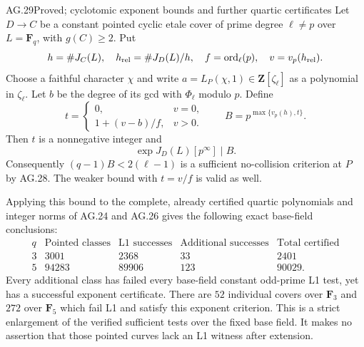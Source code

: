 \begin{claim}{AG.29}{Proved; cyclotomic exponent bounds and further quartic certificates}
Let $D\to C$ be a constant pointed cyclic etale cover
of prime degree $\ell\ne p$ over $L=\mathbf F_q$,
with $g(C)\ge2$. Put
\[
 h=\#J_C(L),\quad h_{\rm rel}=\#J_D(L)/h,
 \quad f=\operatorname{ord}_\ell(p),\quad v=v_p(h_{\rm rel}).
\]
Choose a faithful character $\chi$ and write
$a=L_P(\chi,1)\in\mathbf Z[\zeta_\ell]$ as a polynomial
in $\zeta_\ell$. Let $b$ be the degree of its gcd with
$\Phi_\ell$ modulo $p$. Define
\[
 t=\begin{cases}
 0,&v=0,\\
 1+(v-b)/f,&v>0.
 \end{cases}
 \qquad B=p^{\max\{v_p(h),t\}}.                       \tag{AG.29.1}
\]
Then $t$ is a nonnegative integer and
\[
             \exp J_D(L)[p^\infty]\mid B.
\]
Consequently $(q-1)B<2(\ell-1)$ is a sufficient
no-collision criterion at $P$ by AG.28.
The weaker bound with $t=v/f$ is valid as well.

Applying this bound to the complete, already certified
quartic polynomials and integer norms of AG.24 and AG.26
gives the following exact base-field conclusions:
\[
 \begin{array}{c|r|r|r|r}
 q&\text{Pointed classes}&\text{L1 successes}
   &\text{Additional successes}&\text{Total certified}\\ \hline
 3&3001&2368&33&2401\\
 5&94283&89906&123&90029.
 \end{array}
\]
Every additional class has failed every base-field
constant odd-prime L1 test, yet has a successful exponent
certificate. There are $52$ individual covers over
$\mathbf F_3$ and $272$ over $\mathbf F_5$ which fail
L1 and satisfy this exponent criterion. This is a strict
enlargement of the verified sufficient tests over the
fixed base field. It makes no assertion that those
pointed curves lack an L1 witness after extension.
\end{claim}
